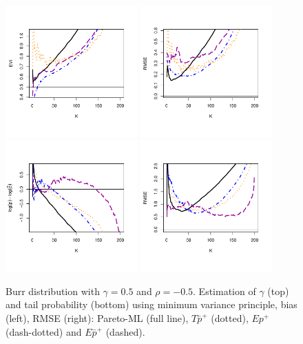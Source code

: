  \begin{figure}[!ht]
 \centering
 \includegraphics[width=0.45\textwidth]{./plots/paper3/burr05Pareto_evi.pdf} 
\includegraphics[width=0.45\textwidth]{./plots/paper3/burr05Pareto_rmse.pdf} \\
\includegraphics[width=0.45\textwidth]{./plots/paper3/burr05Pareto_tail.pdf}
\includegraphics[width=0.45\textwidth]{./plots/paper3/burr05Pareto_tail_rmse.pdf} 
\caption{Burr distribution with $\gamma=0.5$ and $\rho=-0.5$. Estimation of $\gamma$ (top) and tail probability (bottom) using minimum variance principle, bias (left), RMSE (right): Pareto-ML (full line), $T\bar{p}^+$ (dotted), $Ep^+$ (dash-dotted) and $E\bar{p}^+$ (dashed).}
 \label{paper3:fig3}
 \end{figure}
 
